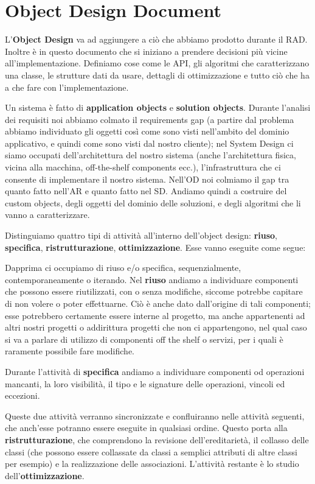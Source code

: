 \chapter{Object Design Document}

    L'\textbf{Object Design} va ad aggiungere a ciò che abbiamo prodotto durante il RAD. Inoltre è in questo documento che si iniziano a prendere decisioni più vicine all'implementazione. Definiamo cose come le API, gli algoritmi che caratterizzano una classe, le strutture dati da usare, dettagli di ottimizzazione e tutto ciò che ha a che fare con l'implementazione.
    
    Un sistema è fatto di \textbf{application objects} e \textbf{solution objects}. Durante l’analisi dei requisiti noi abbiamo colmato il requirements gap (a partire dal problema abbiamo individuato gli oggetti così come sono visti 
    nell’ambito del dominio applicativo, e quindi come sono visti dal nostro cliente); nel System Design ci siamo 
    occupati dell’architettura del nostro sistema (anche l’architettura fisica, vicina alla macchina, off-the-shelf 
    components ecc.), l’infrastruttura che ci consente di implementare il nostro sistema. Nell’OD noi colmiamo 
    il gap tra quanto fatto nell’AR e quanto fatto nel SD. Andiamo quindi a costruire del custom objects, degli 
    oggetti del dominio delle soluzioni, e degli algoritmi che li vanno a caratterizzare.
    
    Distinguiamo quattro tipi di attività all'interno dell'object design: \textbf{riuso}, \textbf{specifica}, \textbf{ristrutturazione}, \textbf{ottimizzazione}. Esse vanno eseguite come segue:
    
    Dapprima ci occupiamo di riuso e/o specifica, sequenzialmente, contemporaneamente o iterando. Nel \textbf{riuso} andiamo a individuare componenti che possono essere riutilizzati, con o senza modifiche, siccome potrebbe capitare di non volere o poter effettuarne. Ciò è anche dato dall'origine di tali componenti; esse potrebbero certamente essere interne al progetto, ma anche appartenenti ad altri nostri progetti o addirittura progetti che non ci appartengono, nel qual caso si va a parlare di utilizzo di componenti off the shelf o servizi, per i quali è raramente possibile fare modifiche.
    
    Durante l'attività di \textbf{specifica} andiamo a individuare componenti od operazioni mancanti, la loro visibilità, il tipo e le signature delle operazioni, vincoli ed eccezioni.
    
    Queste due attività verranno sincronizzate e confluiranno nelle attività seguenti, che anch'esse potranno essere eseguite in qualsiasi ordine. Questo porta alla \textbf{ristrutturazione}, che comprendono la revisione dell'ereditarietà, il collasso delle classi (che possono essere collassate da classi a semplici attributi di altre classi per esempio) e la realizzazione delle associazioni. L'attività restante è lo studio dell'\textbf{ottimizzazione}.
    
